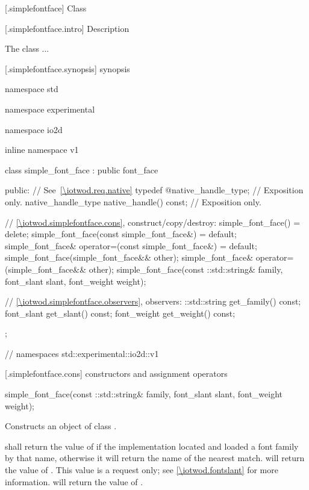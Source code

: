  [\iotwod.simplefontface] {Class }

 [\iotwod.simplefontface.intro] { Description}

\pnum
{}%
The  class ...

 [\iotwod.simplefontface.synopsis] { synopsis}

\begin{codeblock}
namespace std { namespace experimental { namespace io2d { inline namespace v1 {
  class simple_font_face : public font_face {
  public:
    // See~\ref{\iotwod.req.native}
    typedef @\impdef@ native_handle_type; // Exposition only.
    native_handle_type native_handle() const; // Exposition only.
    
    // \ref{\iotwod.simplefontface.cons}, construct/copy/destroy:
    simple_font_face() = delete;
    simple_font_face(const simple_font_face&) = default;
    simple_font_face& operator=(const simple_font_face&) = default;
    simple_font_face(simple_font_face&& other);
    simple_font_face& operator=(simple_font_face&& other);
    simple_font_face(const ::std::string& family, font_slant slant,
      font_weight weight);

    // \ref{\iotwod.simplefontface.observers}, observers:
    ::std::string get_family() const;
    font_slant get_slant() const;
    font_weight get_weight() const;
  };
} } } } // namespaces std::experimental::io2d::v1
\end{codeblock}

 [\iotwod.simplefontface.cons] { constructors and 
assignment operators}

%
\begin{itemdecl}
simple_font_face(const ::std::string& family, font_slant slant,
      font_weight weight);
\end{itemdecl}
\begin{itemdescr}
	\pnum
	\effects
	Constructs an object of class .
	
	\pnum
	\postconditions
	 shall return the value of  if the 
	implementation located and loaded a font family by that name, otherwise it 
	will return the name of the  nearest match.
	 will return the value of .
	\enternote
	This value is a request only; see \ref{\iotwod.fontslant} for more 
	information.
	\exitnote
	 will return the value of .
\end{itemdescr}

